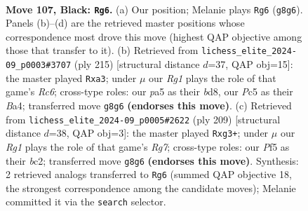 \documentclass[11pt]{article}
\begin{document}
\begin{figure}[p]\centering
\begin{subfigure}{0.46\textwidth}\centering
\resizebox{\linewidth}{!}{%
\newchessgame
\chessboard[
  setfen={6r1/2k5/p7/P1p2p1p/1p3P1P/1P2PKP1/8/5R2 b - - 2 107},
  showmover=false,
  pgfstyle=straightmove, color=movearrow, markmove={g8-g6}
]}
\caption{}
\end{subfigure}\hfill
\begin{subfigure}{0.46\textwidth}\centering
\resizebox{\linewidth}{!}{%
\newchessgame
\chessboard[
  setfen={3B4/5kp1/8/1p1p3p/b2P1K1P/P1r2PP1/3R4/8 b - - 2 108},
  showmover=false,
  pgfstyle=straightmove, color=movearrow, markmove={c3-a3}
]}
\caption{}
\end{subfigure}
\\[4pt]
\begin{subfigure}{0.46\textwidth}\centering
\resizebox{\linewidth}{!}{%
\newchessgame
\chessboard[
  setfen={k7/8/PPp1p3/4Pp2/3P1Pp1/2K3P1/2B3r1/8 b - - 0 105},
  showmover=false,
  pgfstyle=straightmove, color=movearrow, markmove={g2-g3}
]}
\caption{}
\end{subfigure}\hfill

\caption{\textbf{Move 107, Black: \texttt{Rg6}.} (a) Our position; Melanie plays \texttt{Rg6} (\texttt{g8g6}). Panels (b)--(d) are the retrieved master positions whose correspondence most drove this move (highest QAP objective among those that transfer to it). (b) Retrieved from \texttt{lichess\_elite\_2024-09\_p0003\#3707} (ply 215) [structural distance $d$=37, QAP obj=15]: the master played \texttt{Rxa3}; under $\mu$ our \emph{Rg1} plays the role of that game's \emph{Rc6}; cross-type roles: our \emph{p}a5 as their \emph{b}d8, our \emph{P}c5 as their \emph{B}a4; transferred move \texttt{g8g6} \textbf{(endorses this move)}. (c) Retrieved from \texttt{lichess\_elite\_2024-09\_p0005\#2622} (ply 209) [structural distance $d$=38, QAP obj=3]: the master played \texttt{Rxg3+}; under $\mu$ our \emph{Rg1} plays the role of that game's \emph{Rg7}; cross-type roles: our \emph{P}f5 as their \emph{b}c2; transferred move \texttt{g8g6} \textbf{(endorses this move)}. Synthesis: 2 retrieved analogs transferred to \texttt{Rg6} (summed QAP objective 18, the strongest correspondence among the candidate moves); Melanie committed it via the \texttt{search} selector.}
\label{fig:thought-m213}
\end{figure}

\clearpage
\end{document}
